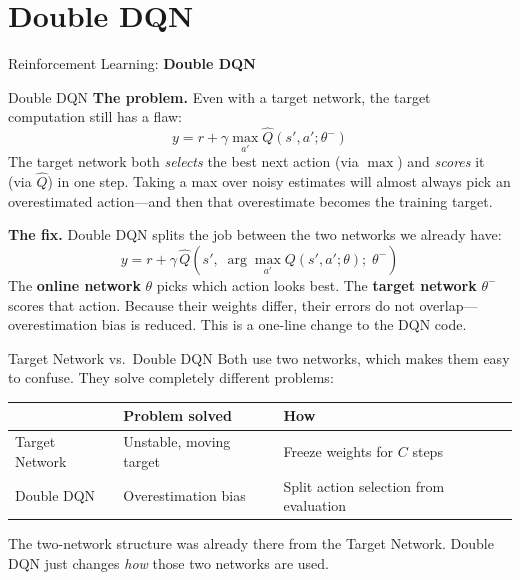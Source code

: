 \section{Double DQN}
\begin{frame}{}
    \LARGE Reinforcement Learning: \textbf{Double DQN}
\end{frame}

\begin{frame}{Double DQN}
    \textbf{The problem.} Even with a target network, the target computation still has a flaw:
    \begin{equation*}
        y = r + \gamma \max_{a'} \hat{Q}(s', a'; \theta^-)
    \end{equation*}
    The target network both \emph{selects} the best next action (via $\max$) and \emph{scores} it (via $\hat{Q}$) in one step. Taking a max over noisy estimates will almost always pick an overestimated action---and then that overestimate becomes the training target.

    \pause
    \vspace{0.5em}
    \textbf{The fix.} Double DQN splits the job between the two networks we already have:
    \begin{equation*}
        y = r + \gamma\, \hat{Q}\!\left(s',\; \arg\max_{a'} Q(s', a'; \theta);\; \theta^- \right)
    \end{equation*}
    The \textbf{online network} $\theta$ picks which action looks best. The \textbf{target network} $\theta^-$ scores that action. Because their weights differ, their errors do not overlap---overestimation bias is reduced. This is a one-line change to the DQN code.
\end{frame}

\begin{frame}{Target Network vs.\ Double DQN}
    Both use two networks, which makes them easy to confuse. They solve completely different problems:

    \vspace{0.5em}
    \begin{table}[]
        \centering
        \renewcommand{\arraystretch}{2.0}
        \begin{tabular}{>{\raggedright\arraybackslash}p{2.5cm} >{\raggedright\arraybackslash}p{3.8cm} >{\raggedright\arraybackslash}p{4.5cm}}
            \hline
            & \textbf{Problem solved} & \textbf{How} \\
            \hline
            Target Network & Unstable, moving target & Freeze weights for $C$ steps \\
            Double DQN & Overestimation bias & Split action selection from evaluation \\
            \hline
        \end{tabular}
    \end{table}

    \vspace{0.5em}
    The two-network structure was already there from the Target Network. Double DQN just changes \emph{how} those two networks are used.
\end{frame}

